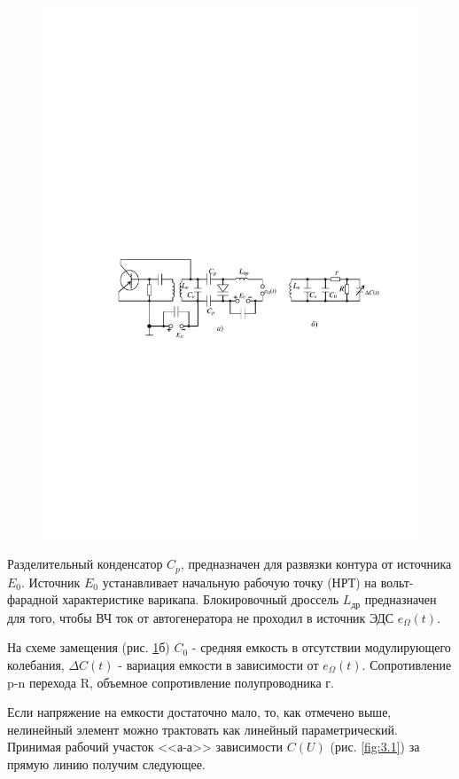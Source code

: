 \documentclass[a4paper,12pt]{article}
\begin{document}
\begin{figure}[H]
	\centering
	\includegraphics[]{fig/fig3-2}
	\caption{}
	\label{fig:3.2}
\end{figure}
Разделительный конденсатор $C_p$, предназначен для развязки контура от источника $E_0$. Источник $E_0$ устанавливает начальную рабочую точку (НРТ) на вольт-фарадной характеристике варикапа. Блокировочный дроссель $L_\text{др}$ предназначен для того, чтобы ВЧ ток от автогенератора не проходил в источник ЭДС $e_{\Omega}(t)$.

На схеме замещения (рис. \ref{fig:3.2}б) $C_0$ - средняя емкость в отсутствии модулирующего колебания, $\Delta C(t)$ - вариация емкости в зависимости от  $e_{\Omega}(t)$. Сопротивление p-n перехода R, объемное сопротивление полупроводника г.

Если напряжение на емкости достаточно мало, то, как отмечено выше, нелинейный элемент можно трактовать как линейный параметрический. Принимая рабочий участок <<а-а>> зависимости $C(U)$ (рис. \ref{fig:3.1}) за прямую линию получим следующее.
\end{document}
